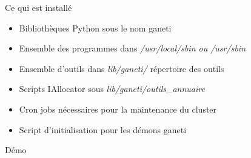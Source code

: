 \begin{frame}{Ce qui est installé}
\begin{itemize}
\item Bibliothèques Python sous le nom ganeti
\pause
\item Ensemble des programmes dans \emph{/usr/local/sbin ou /usr/sbin}
\pause
\item Ensemble d'outils dans \emph{lib/ganeti/} répertoire des outils
\pause
\item Scripts IAllocator sous \emph{lib/ganeti/outils\_annuaire}
\pause
\item Cron jobs nécessaires pour la maintenance du cluster
\pause
\item Script d'initialisation pour les démons ganeti
\end{itemize}
\end{frame}

\begin{frame}
  \begin{center}
   \huge{Démo}
  \end{center}
\end{frame}

%
